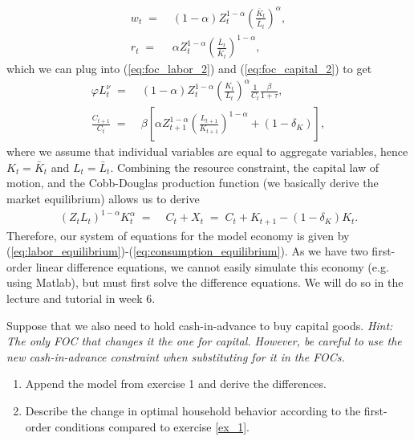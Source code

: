 \documentclass[a4paper, 12pt]{article}
\begin{document}
\begin{Answer}
\begin{small}
\begin{enumerate}
\begin{align*}
				w_t \; = & \; (1-\alpha) Z_t^{1-\alpha} \left(\frac{\bar{K}_t}{\bar{L}_t}\right)^\alpha,\\%
				r_t \; = & \; \alpha Z_t^{1-\alpha} \left(\frac{\bar{L}_t}{\bar{K}_t}\right)^{1-\alpha},%
			\end{align*}%
			which we can plug into (\ref{eq:foc_labor_2}) and (\ref{eq:foc_capital_2}) to get%
			\begin{align}%
				\varphi L_t^\nu \; = & \; (1-\alpha) Z_t^{1-\alpha} \left(\frac{K_t}{L_t}\right)^\alpha \frac{1}{C_t} \frac{\beta}{1+\tau},\label{eq:labor_equilibrium}\\%
				\frac{C_{t+1}}{C_t} \; = & \; \beta \left[ \alpha Z_{t+1}^{1-\alpha} \left(\frac{L_{t+1}}{K_{t+1}}\right)^{1-\alpha} + (1-\delta_K) \right],\label{eq:capital_equilibrium}%
			\end{align}%
			where we assume that individual variables are equal to aggregate variables, hence $K_t=\bar{K}_t$ and $L_t=\bar{L}_t$. Combining the resource constraint, the capital law of motion, and the Cobb-Douglas production function (we basically derive the market equilibrium) allows us to derive%
			\begin{align}%
				\left(Z_t L_t\right)^{1-\alpha} K_t^\alpha \; = & \; C_t + X_t \; = \; C_t + K_{t+1} - (1-\delta_K) K_t.\label{eq:consumption_equilibrium}%
			\end{align}%
			Therefore, our system of equations for the model economy is given by (\ref{eq:labor_equilibrium})-(\ref{eq:consumption_equilibrium}). As we have two first-order linear difference equations, we cannot easily simulate this economy (e.g. using Matlab), but must first solve the difference equations. We will do so in the lecture and tutorial in week 6.%
		\end{enumerate}%
	\end{small}%
\end{Answer}%
\bigskip%
\begin{Exercise}[title={Capital for Cash Assumption},label=ex_2]%
	Suppose that we also need to hold cash-in-advance to buy capital goods. \textit{Hint: The only FOC that changes it the one for capital. However, be careful to use the new cash-in-advance constraint when substituting for it in the FOCs.}%
	\begin{enumerate}%
		\item[a) ] Append the model from exercise 1 and derive the differences.%
		\item[b) ] Describe the change in optimal household behavior according to the first-order conditions compared to exercise \ref{ex_1}.%
	\end{enumerate}%
\end{Exercise}%
\end{document}
